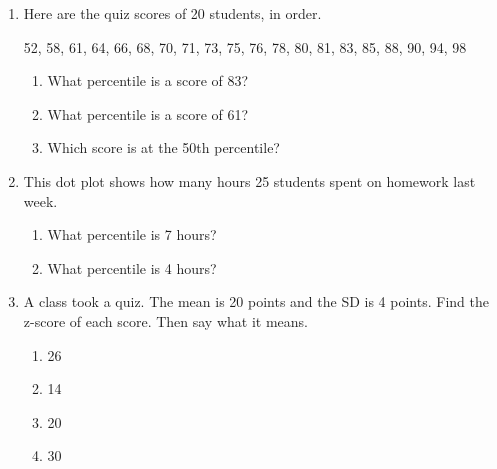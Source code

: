 \documentclass[11pt]{article}
\begin{document}
\newpage
\begin{enumerate}

\item Here are the quiz scores of 20 students, in order.
\begin{center}52, 58, 61, 64, 66, 68, 70, 71, 73, 75, 76, 78, 80, 81, 83, 85, 88, 90, 94, 98\end{center}
\begin{enumerate}[itemsep=1.6em]
  \item What percentile is a score of 83? 
  \item What percentile is a score of 61? 
  \item Which score is at the 50th percentile? 
\end{enumerate}
\work{1.5em}

\item This dot plot shows how many hours 25 students spent on homework last week.
\begin{center}\end{center}
\begin{enumerate}[itemsep=1.6em]
  \item What percentile is 7 hours? 
  \item What percentile is 4 hours? 
\end{enumerate}
\work{1.5em}

\item A class took a quiz. The mean is 20 points and the SD is 4 points. Find the z-score of each score. Then say what it means.
\begin{enumerate}[itemsep=3.5em]
  \item 26 
  \item 14 
  \item 20 
  \item 30 
\end{enumerate}


\end{enumerate}
\end{document}
